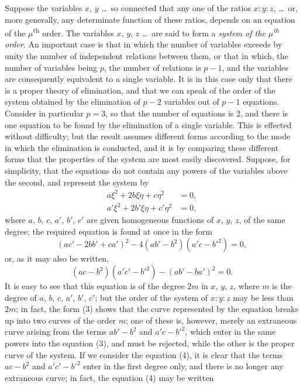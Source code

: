 \documentclass[11pt,a4paper]{book}
\begin{document}
\bigskip

Suppose the variables $x$, $y$ \dots\ so connected that any one of the ratios $x : y : z$, \dots\ or, more generally, any determinate function of these ratios, depends on an equation of the $\mu$\textsuperscript{th} order. The variables $x$, $y$, $z$ \dots\ are said to form a \textit{system of the $\mu$\textsuperscript{th} order}. An important case is that in which the number of variables exceeds by unity the number of independent relations between them, or that in which, the number of variables being $p$, the number of relations is $p - 1$, and the variables are consequently equivalent to a single variable. It is in this case only that there is a proper theory of elimination, and that we can speak of the order of the system obtained by the elimination of $p - 2$ variables out of $p - 1$ equations. Consider in particular $p = 3$, so that the number of equations is 2, and there is one equation to be found by the elimination of a single variable. This is effected without difficulty; but the result assumes different forms according to the mode in which the elimination is conducted, and it is by comparing these different forms that the properties of the system are most easily discovered. Suppose, for simplicity, that the equations do not contain any powers of the variables above the second, and represent the system by
\begin{align}
a\xi^2 + 2b\xi\eta + c\eta^2 &= 0, \tag{1} \\
a'\xi^2 + 2b'\xi\eta + c'\eta^2 &= 0, \tag{2}
\end{align}
where $a$, $b$, $c$, $a'$, $b'$, $c'$ are given homogeneous functions of $x$, $y$, $z$, of the same degree; the required equation is found at once in the form
\begin{equation}
(ac' - 2bb' + ca')^2 - 4(ab' - b^2)(a'c - b'^2) = 0, \tag{3}
\end{equation}
or, as it may also be written,
\begin{equation}
(ac - b^2)(a'c' - b'^2) - (ab' - ba')^2 = 0. \tag{4}
\end{equation}
It is easy to see that this equation is of the degree $2m$ in $x$, $y$, $z$, where $m$ is the degree of $a$, $b$, $c$, $a'$, $b'$, $c'$; but the order of the system of $x : y : z$ may be less than $2m$; in fact, the form (3) shows that the curve represented by the equation breaks up into two curves of the order $m$; one of these is, however, merely an extraneous curve arising from the terms $ab' - b^2$ and $a'c - b'^2$, which enter in the same powers into the equation (3), and must be rejected, while the other is the proper curve of the system. If we consider the equation (4), it is clear that the terms $ac - b^2$ and $a'c' - b'^2$ enter in the first degree only, and there is no longer any extraneous curve; in fact, the equation (4) may be written
\end{document}
